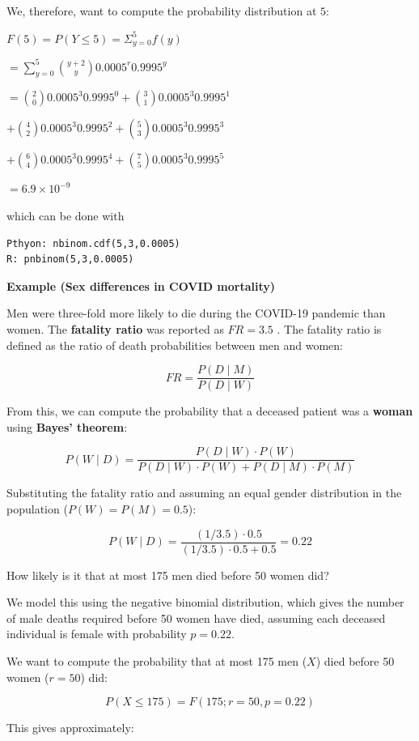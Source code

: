 \documentclass[
]{book}
\begin{document}
We, therefore, want to compute the probability distribution at \(5\):

\(F(5)=P(Y\leq 5)=\Sigma_{y=0}^5 f(y)\)

\(=\sum_{y=0}^5\binom {y+2} y 0.0005^r0.9995^y\)

\(=\binom {2} 0 0.0005^3 0.9995^0 +\binom {3} 1 0.0005^3 0.9995^1\)

\(+\binom {4} 2 0.0005^3 0.9995^2 +\binom {5} 3 0.0005^3 0.9995^3\)

\(+\binom {6} 4 0.0005^3 0.9995^4 +\binom {7} 5 0.0005^3 0.9995^5\)

\(= 6.9\times 10^{-9}\)

which can be done with

\begin{verbatim}
Pthyon: nbinom.cdf(5,3,0.0005)
R: pnbinom(5,3,0.0005)
\end{verbatim}

\textbf{Example (Sex differences in COVID mortality)}

Men were three-fold more likely to die during the COVID-19 pandemic than women. The \textbf{fatality ratio} was reported as \(FR = 3.5\) \citep{DehingiaRaj2021}. The fatality ratio is defined as the ratio of death probabilities between men and women:

\[
FR = \frac{P(D \mid M)}{P(D \mid W)}
\]

From this, we can compute the probability that a deceased patient was a \textbf{woman} using \textbf{Bayes' theorem}:

\[
P(W \mid D) = \frac{P(D \mid W) \cdot P(W)}{P(D \mid W) \cdot P(W) + P(D \mid M) \cdot P(M)}
\]

Substituting the fatality ratio and assuming an equal gender distribution in the population (\(P(W) = P(M) = 0.5\)):

\[
P(W \mid D) = \frac{(1/3.5) \cdot 0.5}{(1/3.5) \cdot 0.5 + 0.5} = 0.22
\]

How likely is it that at most 175 men died before 50 women did?

We model this using the negative binomial distribution, which gives the number of male deaths required before 50 women have died, assuming each deceased individual is female with probability \(p = 0.22\).

We want to compute the probability that at most 175 men (\(X\)) died before 50 women (\(r = 50\)) did:

\[
P(X \leq 175) = F(175; r = 50, p = 0.22)
\]

This gives approximately:
\end{document}
